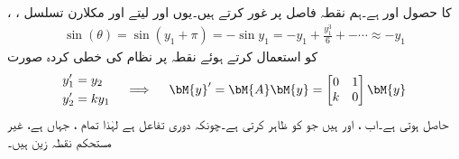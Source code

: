    ، ،   کا حصول  اور  ہے۔ہم نقطہ فاصل  پر غور کرتے ہیں۔یوں  اور  لیتے اور مکلارن تسلسل
\begin{align*}
\sin(\theta)=\sin(y_1+\pi)=-\sin y_1=-y_1+\frac{y_1^3}{6}+-\cdots \approx -y_1
\end{align*}
کو استعمال کرتے ہوئے  نقطہ  پر نظام  کی خطی کردہ صورت 
\begin{gather}
\begin{aligned}
y_1'&=y_2\\
y_2'&=ky_1
\end{aligned}\quad \implies \quad
\begin{aligned}
\bM{y}'=\bM{A}\bM{y}=\begin{bmatrix} 0&1\\ k&0 \end{bmatrix} \bM{y}
\end{aligned}
\end{gather}
حاصل ہوتی ہے۔اب ،  اور  ہیں جو  کو ظاہر کرتی ہے۔چونکہ  دوری تفاعل ہے لہٰذا تمام ،  جہاں  ہے، غیر مستحکم نقطہ زین ہیں۔
